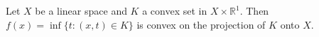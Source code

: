 Let $X$ be a linear space and $K$ a convex set in $X \times \mathbb{R}^1$. Then $f(x) = \inf\{t : (x, t) \in K\}$ is convex on the projection of $K$ onto $X$.
